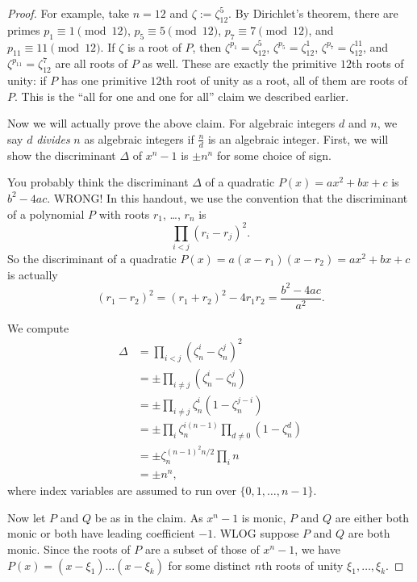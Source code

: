\documentclass[11pt]{scrartcl}
\begin{document}
\begin{proof}
For example, take $n = 12$ and $\zeta := \zeta_{12}^5$. By Dirichlet's theorem, there are primes $p_1 \equiv 1 \pmod{12}$, $p_5 \equiv 5 \pmod{12}$, $p_7 \equiv 7 \pmod{12}$, and $p_{11} \equiv 11 \pmod{12}$. If $\zeta$ is a root of $P$, then $\zeta^{p_1} = \zeta_{12}^5$, $\zeta^{p_5} = \zeta_{12}^1$, $\zeta^{p_7} = \zeta_{12}^{11}$, and $\zeta^{p_{11}} = \zeta_{12}^7$ are all roots of $P$ as well. These are exactly the primitive $12$th roots of unity: if $P$ has one primitive $12$th root of unity as a root, all of them are roots of $P$. This is the ``all for one and one for all'' claim we described earlier.

Now we will actually prove the above claim. For algebraic integers $d$ and $n$, we say $d$ \emph{divides} $n$ as algebraic integers if $\frac nd$ is an algebraic integer. First, we will show the discriminant $\Delta$ of $x^n - 1$ is $\pm n^n$ for some choice of sign.

\begin{remark*}
	You probably think the discriminant $\Delta$ of a quadratic $P(x) = ax^2 + bx + c$ is $b^2 - 4ac$. WRONG! In this handout, we use the convention that the discriminant of a polynomial $P$ with roots $r_1$, \dots, $r_n$ is
	\[\prod_{i < j}(r_i - r_j)^2.\]
	So the discriminant of a quadratic $P(x) = a(x - r_1)(x - r_2) = ax^2 + bx + c$ is actually
	\[(r_1 - r_2)^2 = (r_1 + r_2)^2 - 4r_1r_2 = \frac{b^2 - 4ac}{a^2}.\]
\end{remark*}

We compute
\begin{align*}
	\Delta &= \prod_{i < j}(\zeta_n^i - \zeta_n^j)^2 \\
	&= \pm\prod_{i \neq j}(\zeta_n^i - \zeta_n^j) \\
	&= \pm\prod_{i \neq j}\zeta_n^i(1 - \zeta_n^{j - i}) \\
	&= \pm\prod_i\zeta_n^{i(n - 1)}\prod_{d \neq 0}(1 - \zeta_n^d) \\
	&= \pm\zeta_n^{(n - 1)^2n/2}\prod_in \\
	&= \pm n^n,
\end{align*}
where index variables are assumed to run over $\{0,1,\dots,n - 1\}$.

Now let $P$ and $Q$ be as in the claim. As $x^n - 1$ is monic, $P$ and $Q$ are either both monic or both have leading coefficient $-1$. WLOG suppose $P$ and $Q$ are both monic. Since the roots of $P$ are a subset of those of $x^n - 1$, we have $P(x) = (x - \xi_1) \dots (x - \xi_k)$ for some distinct $n$th roots of unity $\xi_1,\dots,\xi_k$.


\end{proof}
\end{document}
